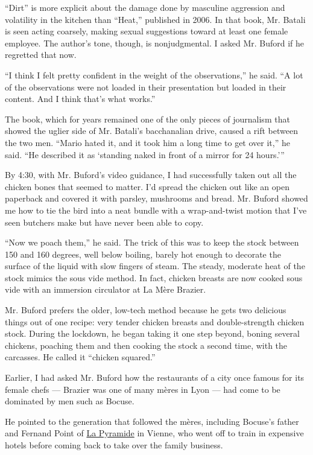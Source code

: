 ``Dirt'' is more explicit about the damage done by masculine aggression
and volatility in the kitchen than ``Heat,'' published in 2006. In that
book, Mr. Batali is seen acting coarsely, making sexual suggestions
toward at least one female employee. The author's tone, though, is
nonjudgmental. I asked Mr. Buford if he regretted that now.

``I think I felt pretty confident in the weight of the observations,''
he said. ``A lot of the observations were not loaded in their
presentation but loaded in their content. And I think that's what
works.''

The book, which for years remained one of the only pieces of journalism
that showed the uglier side of Mr. Batali's bacchanalian drive, caused a
rift between the two men. ``Mario hated it, and it took him a long time
to get over it,'' he said. ``He described it as `standing naked in front
of a mirror for 24 hours.'''

By 4:30, with Mr. Buford's video guidance, I had successfully taken out
all the chicken bones that seemed to matter. I'd spread the chicken out
like an open paperback and covered it with parsley, mushrooms and bread.
Mr. Buford showed me how to tie the bird into a neat bundle with a
wrap-and-twist motion that I've seen butchers make but have never been
able to copy.

``Now we poach them,'' he said. The trick of this was to keep the stock
between 150 and 160 degrees, well below boiling, barely hot enough to
decorate the surface of the liquid with slow fingers of steam. The
steady, moderate heat of the stock mimics the sous vide method. In fact,
chicken breasts are now cooked sous vide with an immersion circulator at
La Mère Brazier.

Mr. Buford prefers the older, low-tech method because he gets two
delicious things out of one recipe: very tender chicken breasts and
double-strength chicken stock. During the lockdown, he began taking it
one step beyond, boning several chickens, poaching them and then cooking
the stock a second time, with the carcasses. He called it ``chicken
squared.''

Earlier, I had asked Mr. Buford how the restaurants of a city once
famous for its female chefs --- Brazier was one of many mères in Lyon
--- had come to be dominated by men such as Bocuse.

He pointed to the generation that followed the mères, including Bocuse's
father and Fernand Point of \href{https://www.lapyramide.com/en/}{La
Pyramide} in Vienne, who went off to train in expensive hotels before
coming back to take over the family business.

